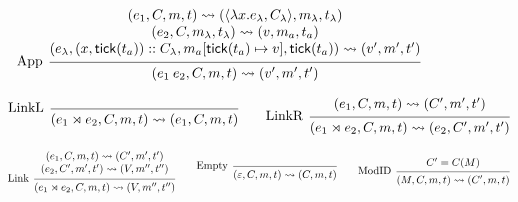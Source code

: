 \documentclass{article}
\theoremstyle{definition}
\newcommand*{\cons}{::}
\newcommand*{\mem}{m}
\newcommand*{\semarrow}{\rightsquigarrow}
\newcommand*{\link}[2]{{#1}\rtimes{#2}}
\newcommand*{\tick}{\mathsf{tick}}
\begin{document}
\begin{figure}[h!]
  \[
    \begin{prooftree}
      \hypo{
        \begin{matrix}
          (e_{1}, C, \mem, t)
          \semarrow
          (\langle\lambda x.e_{\lambda}, C_{\lambda}\rangle, \mem_{\lambda}, t_{\lambda}) \\
          (e_{2}, C, \mem_{\lambda}, t_{\lambda})
          \semarrow
          (v, \mem_{a}, t_{a})                                                            \\
          (e_{\lambda}, (x, \tick(t_{a}))\cons C_{\lambda}, \mem_{a}[\tick(t_{a})\mapsto v], \tick(t_a))
          \semarrow
          (v', \mem',t')
        \end{matrix}
      }
      \infer[left label={App}]1{
      (e_{1}\:e_{2}, C, \mem, t)
      \semarrow
      (v', \mem',t')
      }
    \end{prooftree}
  \]

  \[
    \begin{prooftree}
      \infer[left label=LinkL]0{
      (\link{e_{1}}{e_{2}}, C, \mem, t)
      \semarrow
      (e_{1}, C, \mem, t)
      }
    \end{prooftree}\qquad
    \begin{prooftree}
      \hypo{
        \begin{matrix}
          (e_{1}, C, \mem, t)
          \semarrow
          (C', \mem', t')
        \end{matrix}
      }
      \infer[left label=LinkR]1{
      (\link{e_{1}}{e_{2}}, C, \mem, t)
      \semarrow
      (e_{2}, C', \mem', t')
      }
    \end{prooftree}
  \]

  \[
    \begin{prooftree}
      \hypo{
        \begin{matrix}
          (e_{1}, C, \mem, t)
          \semarrow
          (C', \mem', t') \\
          (e_{2}, C', \mem', t')
          \semarrow
          (V, \mem'', t'')
        \end{matrix}
      }
      \infer[left label=Link]1{
      (\link{e_{1}}{e_{2}}, C, \mem, t)
      \semarrow
      (V, \mem'', t'')
      }
    \end{prooftree}\qquad
    \begin{prooftree}
      \infer[left label=Empty]0{
      (\varepsilon, C, \mem, t)
      \semarrow
      (C, \mem, t)
      }
    \end{prooftree}\qquad
    \begin{prooftree}
      \hypo{C'={C}(M)}
      \infer[left label=ModID]1{
      (M, C, \mem, t)
      \semarrow
      (C', \mem, t)
      }
    \end{prooftree}
  \]


\end{figure}
\end{document}
